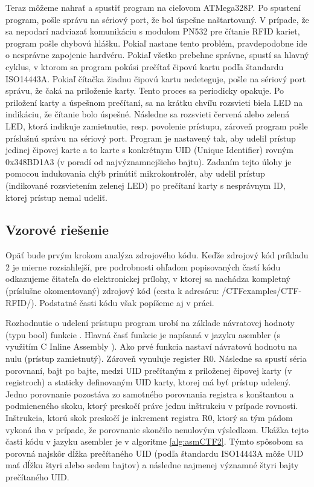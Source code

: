 Teraz môžeme nahrať a spustiť program na cieľovom ATMega328P. Po spustení program, pošle správu na sériový port, že bol úspešne naštartovaný. V prípade, že sa nepodarí nadviazať komunikáciu s modulom PN532 pre čítanie RFID kariet, program pošle chybovú hlášku. Pokiaľ nastane tento problém, pravdepodobne ide o nesprávne zapojenie hardvéru. Pokiaľ všetko prebehne správne, spustí sa hlavný cyklus, v ktorom sa program pokúsi prečítať čipovú kartu podľa štandardu ISO14443A. Pokiaľ čítačka žiadnu čipovú kartu nedeteguje, pošle na sériový port správu, že čaká na priloženie karty. Tento proces sa periodicky opakuje. Po priložení karty a úspešnom prečítaní, sa na krátku chvíľu rozsvieti biela LED na indikáciu, že čítanie bolo úspešné. Následne sa rozsvieti červená alebo zelená LED, ktorá indikuje zamietnutie, resp. povolenie prístupu, zároveň program pošle príslušnú správu na sériový port. Program je nastavený tak, aby udelil prístup jedinej čipovej karte a to karte s konkrétnym UID (Unique Identifier) rovným 0x348BD1A3 (v poradí od najvýznamnejšieho bajtu). Zadaním tejto úlohy je pomocou indukovania chýb prinútiť mikrokontrolér, aby udelil prístup (indikované rozsvietením zelenej LED) po prečítaní karty s nesprávnym ID, ktorej prístup nemal udeliť.

\subsection{Vzorové riešenie}
Opäť bude prvým krokom analýza zdrojového kódu. Keďže zdrojový kód príkladu 2 je mierne rozsiahlejší, pre podrobnosti ohľadom popisovaných častí kódu odkazujeme čitateľa do elektronickej prílohy, v ktorej sa nachádza kompletný (príslušne okomentovaný) zdrojový kód (cesta k adresáru: {\color{olive} /CTFexamples/CTF-RFID/}). Podstatné časti kódu však popíšeme aj v práci.

Rozhodnutie o udelení prístupu program urobí na základe návratovej hodnoty (typu bool) funkcie . Hlavná časť funkcie  je napísaná v jazyku asembler (s využitím C Inline Assembly \cite{inlineAsm}). Ako prvé funkcia nastaví návratovú hodnotu na nulu (prístup zamietnutý). Zároveň vynuluje register R0. Následne sa spustí séria porovnaní, bajt po bajte, medzi UID prečítaným z priloženej čipovej karty (v registroch) a staticky definovaným UID karty, ktorej má byť prístup udelený. Jedno porovnanie pozostáva zo samotného porovnania registra s konštantou a podmieneného skoku, ktorý preskočí práve jednu inštrukciu v prípade rovnosti. Inštrukcia, ktorú skok preskočí je inkrement registra R0, ktorý sa tým pádom vykoná iba v prípade, že porovnanie skončilo nenulovým výsledkom. Ukážka tejto časti kódu v jazyku asembler je v algoritme \ref{alg:asmCTF2}. Týmto spôsobom sa porovná najskôr dĺžka prečítaného UID (podľa štandardu ISO14443A môže UID mať dĺžku štyri alebo sedem bajtov) a následne najmenej významné štyri bajty prečítaného UID. 

